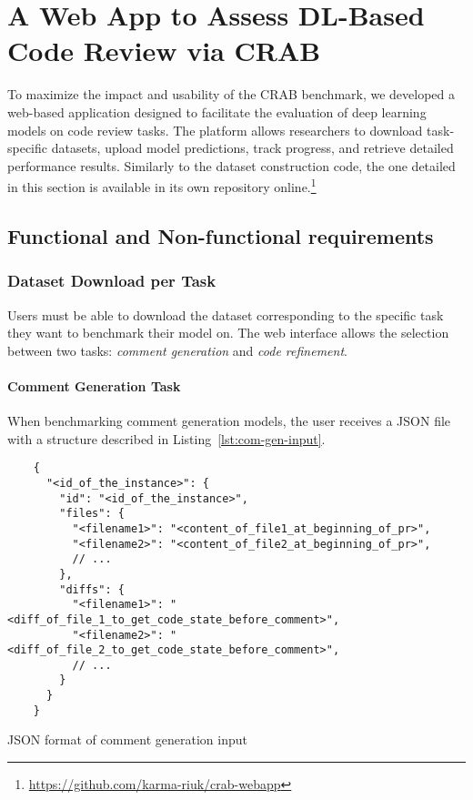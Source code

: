 \section{A Web App to Assess DL-Based Code Review via CRAB}
\label{sec:webapp}

To maximize the impact and usability of the CRAB benchmark, we developed a web-based application
designed to facilitate the evaluation of deep learning models on code review tasks. The platform
allows researchers to download task-specific datasets, upload model predictions, track progress, and
retrieve detailed performance results. Similarly to the dataset construction code, the one detailed
in this section is available in its own repository
online.\footnote{\url{https://github.com/karma-riuk/crab-webapp}}

\subsection{Functional and Non-functional requirements}
\label{sec:req}

\subsubsection{Dataset Download per Task}
\label{sec:dataset-download}

Users must be able to download the dataset corresponding to the specific task they want to benchmark
their model on. The web interface allows the selection between two tasks: \emph{comment generation}
and \emph{code refinement}.

\paragraph{Comment Generation Task}

When benchmarking comment generation models, the user receives a JSON file with a structure
described in Listing~\ref{lst:com-gen-input}.

\begin{listing}[!ht]
	\begin{verbatim}
    {
      "<id_of_the_instance>": {
        "id": "<id_of_the_instance>",
        "files": {
          "<filename1>": "<content_of_file1_at_beginning_of_pr>",
          "<filename2>": "<content_of_file2_at_beginning_of_pr>",
          // ...
        },
        "diffs": {
          "<filename1>": "<diff_of_file_1_to_get_code_state_before_comment>",
          "<filename2>": "<diff_of_file_2_to_get_code_state_before_comment>",
          // ...
        }
      }
    }
    \end{verbatim}
	\caption{JSON format of comment generation input}
	\label{lst:com-gen-input}
\end{listing}


